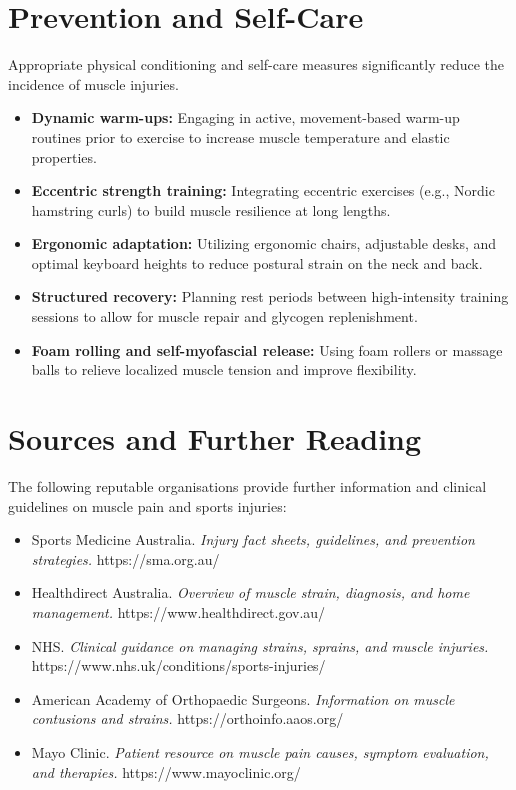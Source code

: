 \section*{Prevention and Self-Care}
Appropriate physical conditioning and self-care measures significantly reduce the incidence of muscle injuries.
\begin{itemize}
    \item \textbf{Dynamic warm-ups:} Engaging in active, movement-based warm-up routines prior to exercise to increase muscle temperature and elastic properties.
    \item \textbf{Eccentric strength training:} Integrating eccentric exercises (e.g., Nordic hamstring curls) to build muscle resilience at long lengths.
    \item \textbf{Ergonomic adaptation:} Utilizing ergonomic chairs, adjustable desks, and optimal keyboard heights to reduce postural strain on the neck and back.
    \item \textbf{Structured recovery:} Planning rest periods between high-intensity training sessions to allow for muscle repair and glycogen replenishment.
    \item \textbf{Foam rolling and self-myofascial release:} Using foam rollers or massage balls to relieve localized muscle tension and improve flexibility.
\end{itemize}

\section*{Sources and Further Reading}
The following reputable organisations provide further information and clinical guidelines on muscle pain and sports injuries:
\begin{itemize}
    \item Sports Medicine Australia. \textit{Injury fact sheets, guidelines, and prevention strategies.} https://sma.org.au/
    \item Healthdirect Australia. \textit{Overview of muscle strain, diagnosis, and home management.} https://www.healthdirect.gov.au/
    \item NHS. \textit{Clinical guidance on managing strains, sprains, and muscle injuries.} https://www.nhs.uk/conditions/sports-injuries/
    \item American Academy of Orthopaedic Surgeons. \textit{Information on muscle contusions and strains.} https://orthoinfo.aaos.org/
    \item Mayo Clinic. \textit{Patient resource on muscle pain causes, symptom evaluation, and therapies.} https://www.mayoclinic.org/
\end{itemize}
